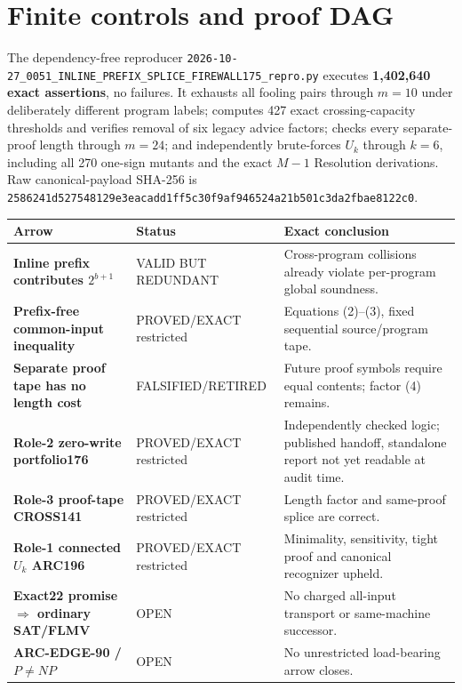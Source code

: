 \documentclass[11pt]{article}
\begin{document}
\section{Finite controls and proof DAG}
The dependency-free reproducer \texttt{2026-10-27\_0051\_INLINE\_PREFIX\_SPLICE\_FIREWALL175\_repro.py} executes \textbf{1,402,640 exact assertions}, no failures.  It exhausts all fooling pairs through $m=10$ under deliberately different program labels; computes 427 exact crossing-capacity thresholds and verifies removal of six legacy advice factors; checks every separate-proof length through $m=24$; and independently brute-forces $U_k$ through $k=6$, including all 270 one-sign mutants and the exact $M-1$ Resolution derivations.  Raw canonical-payload SHA-256 is \texttt{2586241d527548129e3eacadd1ff5c30f9af946524a21b501c3da2fbae8122c0}.

\begin{center}\small
\begin{tabularx}{.98\linewidth}{>{\bfseries}p{.25\linewidth}p{.19\linewidth}X}
\toprule
Arrow & Status & Exact conclusion\\\midrule
Inline prefix contributes $2^{b+1}$ & VALID BUT REDUNDANT & Cross-program collisions already violate per-program global soundness.\\
Prefix-free common-input inequality & PROVED/EXACT restricted & Equations (2)--(3), fixed sequential source/program tape.\\
Separate proof tape has no length cost & FALSIFIED/RETIRED & Future proof symbols require equal contents; factor (4) remains.\\
Role-2 zero-write portfolio176 & PROVED/EXACT restricted & Independently checked logic; published handoff, standalone report not yet readable at audit time.\\
Role-3 proof-tape CROSS141 & PROVED/EXACT restricted & Length factor and same-proof splice are correct.\\
Role-1 connected $U_k$ ARC196 & PROVED/EXACT restricted & Minimality, sensitivity, tight proof and canonical recognizer upheld.\\
Exact22 promise $\Rightarrow$ ordinary SAT/FLMV & OPEN & No charged all-input transport or same-machine successor.\\
ARC-EDGE-90 / $P\ne NP$ & OPEN & No unrestricted load-bearing arrow closes.\\\bottomrule
\end{tabularx}
\end{center}
\end{document}
